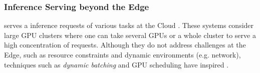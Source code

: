 \subsubsection{\textbf{Inference Serving beyond the Edge}} serves a inference requests of various tasks at the Cloud \cite{shen2019nexus, Tan2021migserving, Choi2022Gpulet, Gujarati2020Clockwork, Zhang2023SHEPHERD, crankshaw2020inferline}.
These systems consider large GPU clusters where one can take several GPUs or a whole cluster to serve a high concentration of requests.
Although they do not address challenges at the Edge, such as resource constraints and dynamic environments (e.g. network), techniques such as \textit{dynamic batching} and GPU scheduling have inspired \systemname{}.



